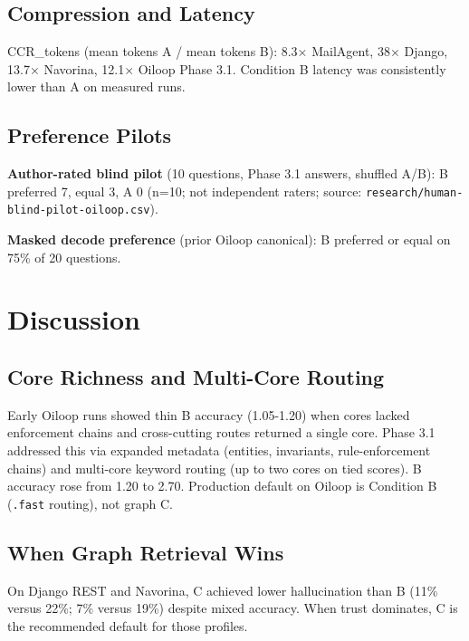 \documentclass[11pt]{article}
\begin{document}
\subsection{Compression and Latency}\label{compression-and-latency}

CCR\_tokens (mean tokens A / mean tokens B): 8.3× MailAgent, 38× Django,
13.7× Navorina, 12.1× Oiloop Phase 3.1. Condition B latency was
consistently lower than A on measured runs.

\subsection{Preference Pilots}\label{preference-pilots}

\textbf{Author-rated blind pilot} (10 questions, Phase 3.1 answers,
shuffled A/B): B preferred 7, equal 3, A 0 (n=10; not independent
raters; source: \texttt{research/human-blind-pilot-oiloop.csv}).

\textbf{Masked decode preference} (prior Oiloop canonical): B preferred
or equal on 75\% of 20 questions.

\section{Discussion}\label{discussion}

\subsection{Core Richness and Multi-Core
Routing}\label{core-richness-and-multi-core-routing}

Early Oiloop runs showed thin B accuracy (1.05-1.20) when cores lacked
enforcement chains and cross-cutting routes returned a single core.
Phase 3.1 addressed this via expanded metadata (entities, invariants,
rule-enforcement chains) and multi-core keyword routing (up to two cores
on tied scores). B accuracy rose from 1.20 to 2.70. Production default
on Oiloop is Condition B (\texttt{.fast} routing), not graph C.

\subsection{When Graph Retrieval Wins}\label{when-graph-retrieval-wins}

On Django REST and Navorina, C achieved lower hallucination than B (11\%
versus 22\%; 7\% versus 19\%) despite mixed accuracy. When trust
dominates, C is the recommended default for those profiles.
\end{document}
